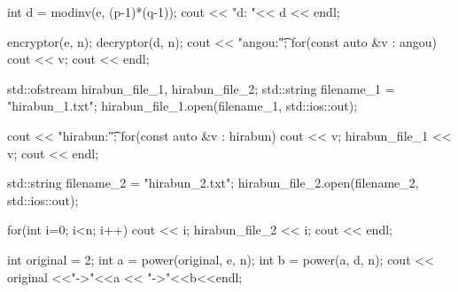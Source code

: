 \documentclass[xelatex, 11pt, a4paper, ja=standard]{bxjsarticle}
\begin{document}
\begin{mylisting}[language=c++,caption=演習課題3のソースコード]
{    int d = modinv(e, (p-1)*(q-1));
    cout << "d: "<< d << endl;

    encryptor(e, n);
    decryptor(d, n);
    cout << "angou:\t";
    for(const auto &v : angou){
        cout << v;
    } cout << endl;

    std::ofstream hirabun_file_1, hirabun_file_2;
    std::string filename_1 = "hirabun_1.txt";
    hirabun_file_1.open(filename_1, std::ios::out);

    cout << "hirabun:\t";
    for(const auto &v : hirabun){
        cout << v;
        hirabun_file_1 << v;
    } cout << endl;

    std::string filename_2 = "hirabun_2.txt";
    hirabun_file_2.open(filename_2, std::ios::out);

    for(int i=0; i<n; i++){
        cout << i;
        hirabun_file_2 << i;
    } cout << endl;




    int original = 2;
    int a = power(original, e, n);
    int b = power(a, d, n);
    cout <<  original <<"->"<<a << "->"<<b<<endl;

}

\end{mylisting}

\end{document}
